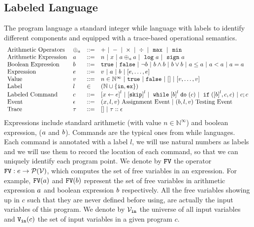 \subsection{Labeled Language}
The program language a standard integer while language with labels to identify different components and equipped with a  trace-based operational semantics.
\[
\begin{array}{llll}
\mbox{Arithmetic Operators} 
& \oplus_a & ::= & + ~|~ - ~|~ \times 
%
~|~ \div ~|~ \emax ~|~ \emin
\\  
\mbox{Arithmetic Expression} 
& \aexpr & ::= & 
n ~|~ {x} ~|~ \aexpr \oplus_a \aexpr  
 ~|~ \elog \aexpr  ~|~ \esign \aexpr
\\
\mbox{Boolean Expression} & \bexpr & ::= & 
%
\etrue ~|~ \efalse  ~|~ \neg \bexpr
 ~|~ \bexpr \land \bexpr
%
~|~ \bexpr \lor \bexpr
~|~ \aexpr \leq \aexpr 
~|~ \aexpr < \aexpr 
~|~ \aexpr = \aexpr 
\\
\mbox{Expression} & \expr & ::= & v ~|~ \aexpr ~|~ \bexpr ~|~ [\expr, \dots, \expr]
\\  
%
\mbox{Value} 
& v & ::= & { n \in \mathbb{N}^{\infty} ~|~ \etrue ~|~ \efalse ~|~ [] ~|~ [v, \dots, v]} \\
%
\mbox{Label} 
& l & \in & (\mathbb{N} \cup \{\lin, \lex\}) 
\\ 
%
\mbox{Labeled Command} 
& {c} & ::= &  
\clabel{\assign{x}{\expr}}^l 
~|~  \clabel{\eskip}^l
~|~ \ewhile \clabel{\bexpr}^{l} \edo ({c})
~|~ \eif(\clabel{\bexpr}^{l} , {c}, {c}) 
~|~ {c};{c}  
\\ 
\mbox{Event} 
& \event & ::= & 
({x}, l, v) ~ \mbox{Assignment Event} 
~|~(\bexpr, l, v) ~ \mbox{Testing Event}
\\
\mbox{Trace} & \trace
& ::= & [] ~|~ \trace :: \event
\\
\end{array}
\]
Expressions include
standard arithmetic (with value $n \in \mathbb{N}^{\infty}$) and boolean expression, ($a$ and $b$).
Commands are the typical ones from while languages. Each command is annotated with a label $l$, we will use natural numbers as labels and we will use them to record
the location of each command, so that we can uniquely identify each program point.
We denote by $\mathtt{FV}$ the operator $\mathtt{FV}: e \to \mathcal{P}(\mathcal{V})$, which computes the set of free variables in an expression. For example,
$\mathtt{FV}(a)$ and $\mathtt{FV}(b)$ represent the set of free variables in arithmetic
expression $a$ and boolean expression $b$ respectively.
All the free variables
showing up in $c$ such that they are never defined before using, are actually the input variables of this program.
We denote by $\mathcal{V}_{\mathtt{in}}$ the universe of all input variables and $\mathtt{V_{\mathtt{in}}}(c)$ the set of input variables in a given program $c$.

